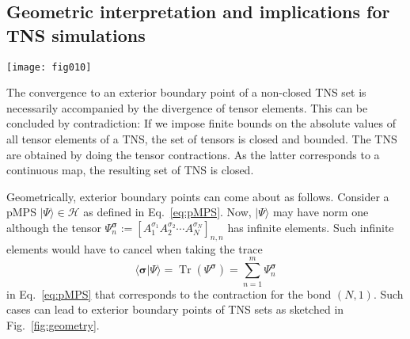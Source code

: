 \documentclass[english,11pt,aps,pra,onecolumn,tightenlines,groupedaddress,superscriptaddress,notitlepage,floatfix,fleqn]{revtex4-1}
\newcommand{\bra}{\langle}
\newcommand{\ket}{\rangle}
\newcommand{\Tr}{\operatorname{Tr}}
\renewcommand{\vec}[1]{{\boldsymbol{#1}}}
\newcommand{\s}{\sigma}
\newcommand{\vs}{\vec{\sigma}}
\newcommand{\mc}[1]{\mathcal{#1}}
\renewcommand{\H}{\mc{H}}
\newcommand{\V}{\mc{V}}
\newcommand{\M}{\mc{M}}
\begin{document}
\subsection{Geometric interpretation and implications for TNS simulations}\label{sec:geometry}
\begin{figure*}[t]
\label{fig:geometry}
\texttt{[image: fig010]}
\caption{The sketch illustrates why sets $\M$ of normalizable TNS can feature exterior boundary points. As an example a pMPS \eqref{eq:pMPS} is determined by the diagonal elements $\Psi^\vs_{n}=[A_1^{\s_1}A_2^{\s_2}\dotsb A_N^{\s_N}]_{n,n}$ with $n=1,\dotsc,m$. They can be interpreted as elements of $\H\otimes\V$, where $\V$ is the $m$ dimensional bond vector space. Diverging elements $\Psi^\vs_{n}$ may cancel when projecting onto the physical Hilbert space $\H$ such that the state $|\Psi\ket=\sum_{n=1}^m \Psi^\vs_n |\vs\ket$ is normalizable. In the illustration, the three-dimensional space represents $\H\otimes\V$, the red curve that diverges to $z\to\infty$ at its ends represents $\Psi^\vs_{n}$, the shaded $xy$ plane represents $\H$, and the blue curve represents the TNS set $\M\subset \H$. Its two boundary points $|\psi_1\ket$ and $|\psi_2\ket$ are not included and are analogs of states like the W state \eqref{eq:Wstate} for tiMPS or the two-domain states \eqref{eq:2DS} for pMPS.}
\end{figure*}
The convergence to an exterior boundary point of a non-closed TNS set is necessarily accompanied by the divergence of tensor elements. This can be concluded by contradiction: If we impose finite bounds on the absolute values of all tensor elements of a TNS, the set of tensors is closed and bounded. The TNS are obtained by doing the tensor contractions. As the latter corresponds to a continuous map, the resulting set of TNS is closed.

Geometrically, exterior boundary points can come about as follows. Consider a pMPS $|\Psi\ket\in\H$ as defined in Eq.~\eqref{eq:pMPS}. Now, $|\Psi\ket$ may have norm one although the tensor $\Psi^\vs_{n}:=[A_1^{\s_1}A_2^{\s_2}\dotsb A_N^{\s_N}]_{n,n}$ has infinite elements. Such infinite elements would have to cancel when taking the trace
\begin{equation}\textstyle
	\bra\vs|\Psi\ket=\Tr\left( \Psi^\vs\right)=\sum_{n=1}^m \Psi^\vs_n
\end{equation}
in Eq.~\eqref{eq:pMPS} that corresponds to the contraction for the bond $(N,1)$. Such cases can lead to exterior boundary points of TNS sets as sketched in Fig.~\ref{fig:geometry}.
\end{document}
